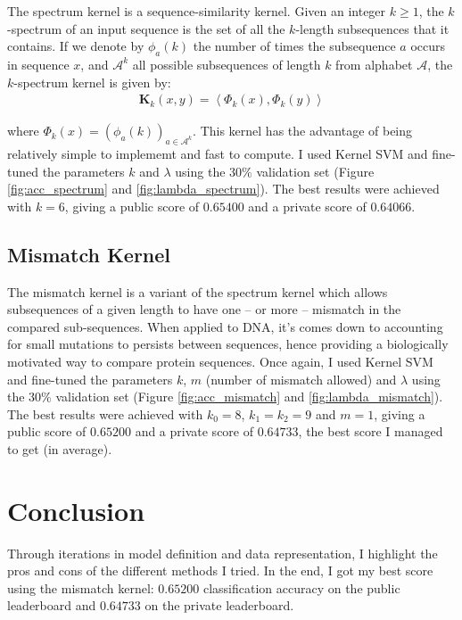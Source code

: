 \documentclass[final]{cvpr}
\begin{document}
	The spectrum kernel \cite{spectrum} is a sequence-similarity kernel. Given an integer $k \geq 1$, the $k$-spectrum of an input sequence is the set of all the $k$-length subsequences that it contains. If we denote by $\phi_a(k)$ the number of times the subsequence $a$ occurs in sequence $x$, and $ \mathcal{A}^k$ all possible subsequences of length $k$ from alphabet $\mathcal{A}$, the $k$-spectrum kernel is given by:
	\vspace{-0.1mm}
	\begin{equation*}
		\begin{aligned}
			\mathbf{K}_k (x, y) = \left\langle \Phi_k (x), \Phi_k (y) \right\rangle
		\end{aligned}
	\end{equation*}
	
	\noindent
	 where $\Phi_k (x) = \left( \phi_a(k)  \right)_{a \in \mathcal{A}^k}$. This kernel has the advantage of being relatively simple to implememt and fast to compute. I used Kernel SVM and fine-tuned the parameters $k$ and $\lambda$ using the $30\%$ validation set (Figure \ref{fig:acc_spectrum} and \ref{fig:lambda_spectrum}). The best results were achieved with $k=6$, giving a public score of $0.65400$ and a private score of $0.64066$.
	
	\subsection{Mismatch Kernel}
	
	The mismatch kernel \cite{mismatch} is a variant of the spectrum kernel which allows subsequences of a given length to have one -- or more -- mismatch in the compared sub-sequences. When applied to DNA, it's comes down to accounting for small mutations to persists between sequences, hence providing a biologically motivated way to compare protein sequences. Once again, I used Kernel SVM and fine-tuned the parameters $k$, $m$ (number of mismatch allowed) and $\lambda$ using the $30\%$ validation set (Figure \ref{fig:acc_mismatch} and \ref{fig:lambda_mismatch}). The best results were achieved with $k_0=8$, $k_1 = k_2 = 9$ and $m=1$, giving a public score of $0.65200$ and a private score of $0.64733$, the best score I managed to get (in average).
	
	\section{Conclusion}
	
	Through iterations in model definition and data representation, I highlight the pros and cons of the different methods I tried. In the end, I got my best score using the mismatch kernel: $0.65200$ classification accuracy on the public leaderboard and $0.64733$ on the private leaderboard. 
	
\end{document}
